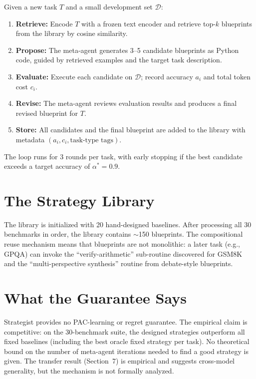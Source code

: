 \documentclass[10pt,twocolumn]{article}
\begin{document}
Given a new task $T$ and a small development set $\mathcal{D}$:

\begin{enumerate}[itemsep=2pt,parsep=0pt]
  \item \textbf{Retrieve:} Encode $T$ with a frozen text encoder and
    retrieve top-$k$ blueprints from the library by cosine similarity.
  \item \textbf{Propose:} The meta-agent generates 3--5 candidate
    blueprints as Python code, guided by retrieved examples and the
    target task description.
  \item \textbf{Evaluate:} Execute each candidate on $\mathcal{D}$;
    record accuracy $a_i$ and total token cost $c_i$.
  \item \textbf{Revise:} The meta-agent reviews evaluation results and
    produces a final revised blueprint for $T$.
  \item \textbf{Store:} All candidates and the final blueprint are added
    to the library with metadata $(a_i, c_i, \text{task-type tags})$.
\end{enumerate}

The loop runs for 3 rounds per task, with early stopping if the best
candidate exceeds a target accuracy of $\alpha^* = 0.9$.

\section{The Strategy Library}

The library is initialized with 20 hand-designed baselines. After
processing all 30 benchmarks in order, the library contains
$\sim$150 blueprints. The compositional reuse mechanism means that
blueprints are not monolithic: a later task (e.g., GPQA) can invoke
the ``verify-arithmetic'' sub-routine discovered for GSM8K and the
``multi-perspective synthesis'' routine from debate-style blueprints.

\section{What the Guarantee Says}

Strategist provides no PAC-learning or regret guarantee. The empirical
claim is competitive: on the 30-benchmark suite, the designed strategies
outperform all fixed baselines (including the best oracle fixed strategy
per task). No theoretical bound on the number of meta-agent iterations
needed to find a good strategy is given. The transfer result
(Section~7) is empirical and suggests cross-model generality, but
the mechanism is not formally analyzed.
\end{document}
